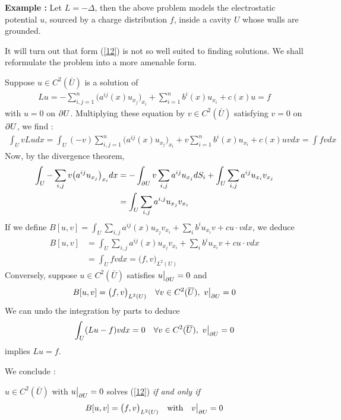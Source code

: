 \documentclass[10pt,a4paper]{report}
\begin{document}
\textbf{Example :} Let $L=-\Delta$, then the above problem models the electrostatic potential $u$, sourced by a charge distribution $f$, inside a cavity $U$ whose walls are grounded.
\s

It will turn out that form (\ref{12}) is not so well suited to finding solutions. We shall reformulate the problem into a more amenable form.

\quad Suppose $u\in C^2(\bar{U})$ is a solution of
\begin{align*}
Lu = - \sum_{i,j=1}^n \big( a^{ij}(x) u_{x_j} \big)_{x_i} + \sum_{i=1}^n b^i (x) u_{x_i} + c(x)u = f
\end{align*}
with $u=0$ on $\partial U$. Multiplying these equation by $v\in C^2(\bar{U})$ satisfying $v=0$ on $\partial U$, we find :
\begin{align*}
\int_U vLu dx = \int_U (-v) \sum_{i,j=1}^n \big( a^{ij}(x) u_{x_j} \big)_{x_i} + v\sum_{i=1}^n b^i (x) u_{x_i} + c(x)u v dx = \int fv dx
\end{align*}
Now, by the divergence theorem,
\begin{align*}
\int_U -\sum_{i,j} v\big(a^{ij}u_{x_j}\big)_{x_i} dx &= - \int_{\partial U} v \sum_{i,j} a^{ij} u_{x_j} dS_i + \int_U \sum_{i,j} a^{ij} u_{x_i} v_{x_j} \\
&= \int_U \sum_{i,j} a^{i,j} u_{x_j} v_{x_i}
\end{align*}
If we define $B[u,v] = \int_U \sum_{i,j} a^{ij}(x) u_{x_j} v_{x_i} + \sum_{i} b^i u_{x_i} v + cu\cdot v dx$, we deduce 
\begin{align*}
B[u,v] &= \int_U \sum_{i,j} a^{ij}(x) u_{x_j} v_{x_i} + \sum_{i} b^i u_{x_i} v + cu\cdot v dx \\
&= \int_U fv dx = \big(f,v \big)_{L^2(U)} 
\end{align*}
Conversely, suppose $u\in C^2(\bar{U})$ satisfies $u\big|_{\partial U} = 0$ and
\begin{align*}
B[u,v] = \big( f,v \big)_{L^2(U)} \quad \forall v \in C^2(\overline{U}), \,\, v\big|_{\partial U} =0
\end{align*}
We can undo the integration by parts to deduce
\begin{align*}
\int_U (Lu -f) v dx =0 \quad \forall v \in C^2(\overline{U}), \,\, v\big|_{\partial U} =0
\end{align*}
implies $Lu=f$.
\s

We conclude :

\quad $u \in C^2(\bar{U})$ with $u \big|_{\partial U} =0$ solves (\ref{12}) \emph{if and only if}
\begin{align*}
B[u,v] = \big( f,v \big)_{L^2(U)} \quad \text{with} \quad v\big|_{\partial U} = 0
\end{align*}
\s
\end{document}
